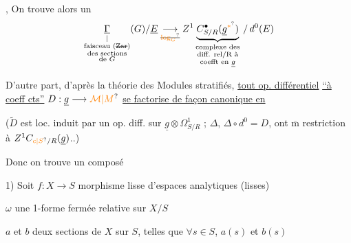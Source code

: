 , On trouve alors un 
\[
\underset{\substack{\vert\\\text{faisceau }(\deleted{\text{Zar}})\\
 \text{des sections}\\\text{de }G}}{\underline{\Gamma}}(G)/\underline E
\underset{\deleted{\unsure{\log_G}}}{\longrightarrow}
Z^1\underbrace{C_{S/R}^{\bullet}(\underline g^{\unsure{*}})}_{
 \substack{\text{complexe des}\\\text{diff. rel/R à}\\\text{coefft en }\underline g}}
\,/\,d^0(E)
\]

D'autre part, d'après la théorie des Modules stratifiés, \uline{tout op. différentiel} \uline{``à coeff cts''} $D:\underline g\longrightarrow \unsure{\mathcal M|M}$
 \uline{se factorise de façon canonique en}

($\widetilde D$ est loc. induit par un op. diff. sur $\underline g\otimes\Omega^1_{S/R}$ ;   $\Delta$,   $\Delta\circ d^0=D$, ont $\overline{\mathrm m}$ restriction à $Z^1C_{\unsure{c|S}/R}(\underline g)$..)

Donc on trouve un composé

1) Soit $f:X\longrightarrow S$ morphisme lisse d'espaces analytiques (lisses)

$\omega$ une 1-forme fermée  relative sur $X/S$

$a$ et $b$ deux sections  de $X$ sur $S$, telles que $\forall s\in S$, $a(s)$ et $b(s)$ 

